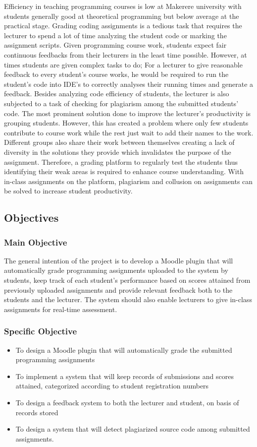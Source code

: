 \documentclass[12pt]{article}
\begin{document}
	Efficiency in teaching programming courses is low at Makerere university with students generally good at theoretical programming but below average at the practical stage. Grading coding assignments is a tedious task that requires the lecturer to spend a lot of time analyzing the student code or marking the assignment scripts. Given programming course work, students expect fair continuous feedbacks from their lecturers in the least time possible. However, at times students are given complex tasks to do; For a lecturer to give reasonable feedback to every student’s course works, he would be required to run the student’s code into IDE’s to correctly analyses their running times and generate a feedback. Besides analyzing code efficiency of students, the lecturer is also subjected to a task of checking for plagiarism among the submitted students’ code. The most prominent solution done to improve the lecturer’s productivity is grouping students. However, this has created a problem where only few students contribute to course work while the rest just wait to add their names to the work. Different groups also share their work between themselves creating a lack of diversity in the solutions they provide which invalidates the purpose of the assignment. Therefore, a grading platform to regularly test the students thus identifying their weak areas is required to enhance course understanding. With in-class assignments on the platform, plagiarism and collusion on assignments can be solved to increase student productivity.
	
	\subsection{Objectives}
		\subsubsection{Main Objective}
		The general intention of the project is to develop a Moodle plugin that will automatically grade programming assignments 		uploaded to the system by students, keep track of each student’s performance based on scores attained from previously 			uploaded assignments and provide relevant feedback both to the students and the lecturer. The system should also enable 			lecturers to give in-class assignments for real-time assessment.
		\subsubsection{Specific Objective}
		\begin{itemize}
			\item To design a Moodle plugin that will automatically grade the submitted programming assignments 
			\item To implement a system that will keep records of submissions and scores attained, categorized according to 						student registration numbers
			\item To design a feedback system to both the lecturer and student, on basis of records stored
			\item To design a system that will detect plagiarized source code among submitted assignments.
		\end{itemize}
		
\end{document}

